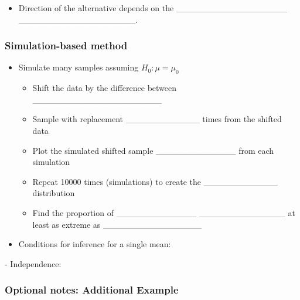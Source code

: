 \documentclass[
]{report}
\providecommand{\tightlist}{%
  \setlength{\itemsep}{0pt}\setlength{\parskip}{0pt}}
\newcommand{\rgi}{\hspace{24pt}}  %
\begin{document}

\begin{itemize}
\tightlist
\item
  Direction of the alternative depends on the \_\_\_\_\_\_\_\_\_\_\_\_\_\_\_\_\_\_ \_\_\_\_\_\_\_\_\_\_\_\_\_\_\_\_\_\_\_.
\end{itemize}


\subsubsection*{Simulation-based method}\label{simulation-based-method-2}

\begin{itemize}
\item
  Simulate many samples assuming \(H_0: \mu = \mu_0\)

  \begin{itemize}
  \item
    Shift the data by the difference between \_\_\_\_\_\_\_\_\_\_\_\_\_\_\_\_\_\_\_\_\_
  \item
    Sample with replacement \_\_\_\_\_\_\_\_\_\_\_\_ times from the shifted data
  \item
    Plot the simulated shifted sample \_\_\_\_\_\_\_\_\_\_\_\_\_ from each simulation
  \item
    Repeat 10000 times (simulations) to create the \_\_\_\_\_\_\_\_\_\_\_\_ distribution
  \item
    Find the proportion of \_\_\_\_\_\_\_\_\_\_\_\_\_ \_\_\_\_\_\_\_\_\_\_\_\_\_\_ at least as extreme as \_\_\_\_\_\_\_\_\_\_\_\_\_\_\_\_
  \end{itemize}
\end{itemize}

\newpage

\begin{itemize}
\tightlist
\item
  Conditions for inference for a single mean:
\end{itemize}

\rgi \rgi - Independence:

\subsubsection*{Optional notes: Additional Example}\label{optional-notes-additional-example-4}
\end{document}
